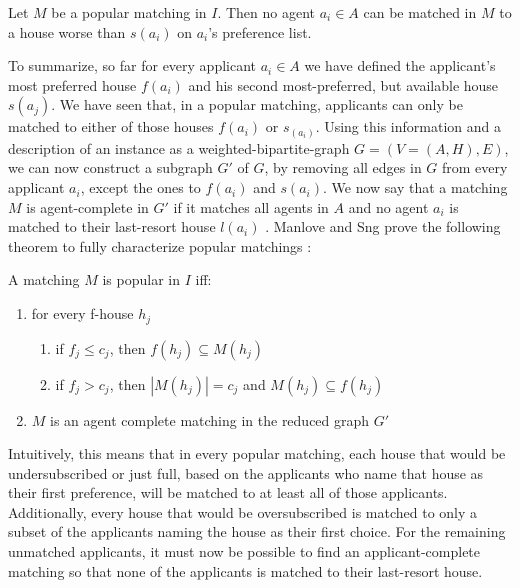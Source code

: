 \newtheorem{lemma-popular-3}[theorem]{Lemma}
\begin{lemma}\label{lemma-popular3}
    Let $M$ be a popular matching in $I$. Then no agent $a_i \in A$ can be matched in $M$ to a house worse than $s(a_i)$ on $a_i$'s preference list.
\end{lemma} 

To summarize, so far for every applicant $a_i \in A$ we have defined the applicant's most preferred house $f(a_i)$ and his second most-preferred, but available house $s(a_j)$. We have seen that, in a popular matching, applicants can only be matched to either of those houses $f(a_i)$ or $s_(a_i)$. Using this information and a description of an instance as a weighted-bipartite-graph $G = (V=(A, H), E)$, we can now construct a subgraph $G'$ of $G$, by removing all edges in $G$ from every applicant $a_i$, except the ones to $f(a_i)$ and $s(a_i)$. We now say that a matching $M$ is agent-complete in $G'$ if it matches all agents in $A$ and no agent $a_i$ is matched to their last-resort house $l(a_i)$ \cite{ManlovePopularMatchings}. Manlove and Sng prove the following theorem to fully characterize popular matchings \cite{ManlovePopularMatchings}:
\newtheorem{theorem-popular-4}[theorem]{Theorem}
\begin{theorem}\label{theorem-popular-4}
    A matching $M$ is popular in $I$ iff:
    \begin{enumerate}
        \item for every f-house $h_j$
        \begin{enumerate}
            \item\label{condition1a} if $f_j \leq c_j$, then $f(h_j) \subseteq M(h_j)$
            \item\label{condition1b} if $f_j > c_j$, then $|M(h_j)| = c_j$ and $M(h_j) \subseteq f(h_j)$
        \end{enumerate}
        \item $M$ is an agent complete matching in the reduced graph $G'$
    \end{enumerate}
\end{theorem} 

Intuitively, this means that in every popular matching, each house that would be undersubscribed or just full, based on the applicants who name that house as their first preference, will be matched to at least all of those applicants. Additionally, every house that would be oversubscribed is matched to only a subset of the applicants naming the house as their first choice. For the remaining unmatched applicants, it must now be possible to find an applicant-complete matching so that none of the applicants is matched to their last-resort house.


